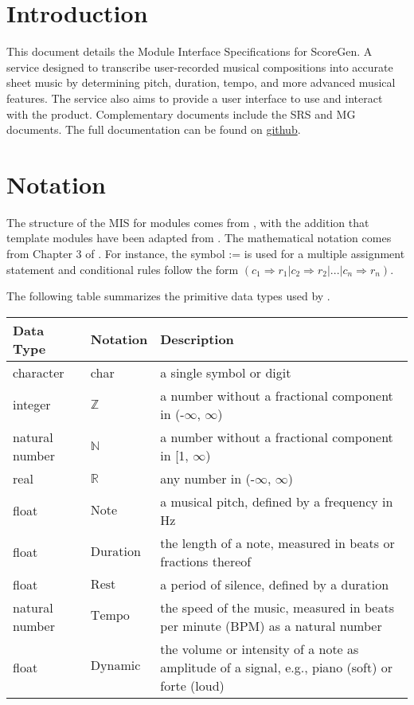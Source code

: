 \documentclass[12pt, titlepage]{article}
\begin{document}
\section{Introduction}
This document details the Module Interface Specifications for ScoreGen. A service designed to transcribe user-recorded musical compositions into accurate sheet music by determining pitch, duration, tempo, and more advanced musical features. The service also aims to provide a user interface to use and interact with the product. Complementary documents include the SRS and MG documents. The full documentation can be found on \href{https://github.com/emilyperica/ScoreGen}{github}.


\section{Notation}


The structure of the MIS for modules comes from \citet{HoffmanAndStrooper1995},
with the addition that template modules have been adapted from
\cite{GhezziEtAl2003}.  The mathematical notation comes from Chapter 3 of
\citet{HoffmanAndStrooper1995}.  For instance, the symbol := is used for a
multiple assignment statement and conditional rules follow the form $(c_1
\Rightarrow r_1 | c_2 \Rightarrow r_2 | ... | c_n \Rightarrow r_n )$.

The following table summarizes the primitive data types used by \progname. 

\begin{center}
\renewcommand{\arraystretch}{1.2}
\noindent 
\begin{tabular}{l l p{7.5cm}} 
\toprule 
\textbf{Data Type} & \textbf{Notation} & \textbf{Description}\\ 
\midrule
character & char & a single symbol or digit\\
integer & $\mathbb{Z}$ & a number without a fractional component in (-$\infty$, $\infty$) \\
natural number & $\mathbb{N}$ & a number without a fractional component in [1, $\infty$) \\
real & $\mathbb{R}$ & any number in (-$\infty$, $\infty$)\\
float & $\text{Note}$ & a musical pitch, defined by a frequency in Hz\\ 
float & $\text{Duration}$ & the length of a note, measured in beats or fractions thereof\\ 
float & $\text{Rest}$ & a period of silence, defined by a duration\\ 
natural number & $\text{Tempo}$ & the speed of the music, measured in beats per minute (BPM) as a natural number\\ 
float & $\text{Dynamic}$ & the volume or intensity of a note as amplitude of a signal, e.g., piano (soft) or forte (loud)\\

\bottomrule
\end{tabular} 
\end{center}
\end{document}
